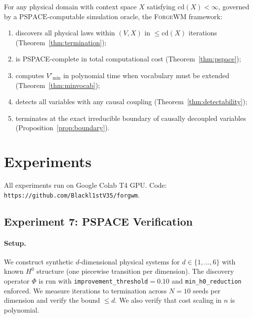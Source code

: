 \documentclass[twoside,11pt]{article}
\newcommand{\cd}{\mathrm{cd}}
\newcommand{\ForgeWM}{\textsc{ForgeWM}\xspace}
\begin{document}
\begin{theorem}
\label{thm:omega}
For any physical domain with context space $X$ satisfying $\cd(X) <
\infty$, governed by a $\mathrm{PSPACE}$-computable simulation oracle,
the \ForgeWM framework:
\begin{enumerate}[label=(\roman*)]
  \item discovers all physical laws within $(V, X)$ in $\leq \cd(X)$
    iterations \textnormal{(Theorem~\ref{thm:termination})};
  \item is \textrm{PSPACE}-complete in total computational cost
    \textnormal{(Theorem~\ref{thm:pspace})};
  \item computes $V'_{\min}$ in polynomial time when vocabulary must
    be extended \textnormal{(Theorem~\ref{thm:minvocab})};
  \item detects all variables with any causal coupling
    \textnormal{(Theorem~\ref{thm:detectability})};
  \item terminates at the exact irreducible boundary of causally
    decoupled variables \textnormal{(Proposition~\ref{prop:boundary})}.
\end{enumerate}
\end{theorem}

\section{Experiments}
\label{sec:experiments}

All experiments run on Google Colab T4 GPU.
Code: \texttt{https://github.com/Blackl1stV35/forgwm}.

\subsection{Experiment 7: PSPACE Verification}
\label{sec:exp7}

\paragraph{Setup.}
We construct synthetic $d$-dimensional physical systems for $d \in
\{1,\ldots,6\}$ with known $H^0$ structure (one piecewise transition
per dimension). The discovery operator $\Phi$ is run with
\texttt{improvement\_threshold}$=0.10$ and \texttt{min\_h0\_reduction}
enforced. We measure iterations to termination across $N=10$ seeds
per dimension and verify the bound $\leq d$. We also verify that
cost scaling in $n$ is polynomial.
\end{document}
